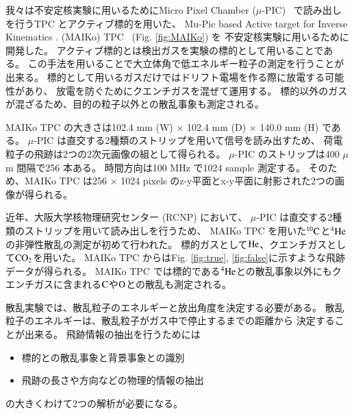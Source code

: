 \documentclass{jps-cp}
\begin{document}
我々は不安定核実験に用いるためにMicro Pixel Chamber ($\mu$-PIC)~\cite{mupic} 
で読み出しを行うTPC とアクティブ標的を用いた、
Mu-Pic based Active target for Inverse Kinematics . (MAIKo) TPC~\cite{MAIKo} (Fig. \ref{fig:MAIKo}) を
不安定核実験に用いるために開発した。
アクティブ標的とは検出ガスを実験の標的として用いることである。
この手法を用いることで大立体角で低エネルギー粒子の測定を行うことが出来る。
標的として用いるガスだけではドリフト電場を作る際に放電する可能性があり、
放電を防ぐためにクエンチガスを混ぜて運用する。
標的以外のガスが混ざるため、目的の粒子以外との散乱事象も測定される。

MAIKo TPC の大きさは102.4 mm (W) $\times$ 102.4 mm (D) $\times$ 140.0 mm (H) である。
$\mu$-PIC は直交する2種類のストリップを用いて信号を読み出すため、
荷電粒子の飛跡は2つの2次元画像の組として得られる。
$\mu$-PIC のストリップは400 $\mu$m 間隔で256 本ある。
時間方向は100 MHz で1024 sample 測定する。
そのため、MAIKo TPC は256 $\times$ 1024 pixels のz-y平面とx-y平面に射影された2つの画像が得られる。

近年、大阪大学核物理研究センター (RCNP) において、
$\mu$-PIC は直交する2種類のストリップを用いて読み出しを行うため、
MAIKo TPC を用いた${}^{10}\rm{C}$と${}^{4}\rm{He}$の非弾性散乱の測定が初めて行われた。
標的ガスとして$\rm{He}$、クエンチガスとして$\rm{CO}_2$を用いた。
MAIKo TPC からはFig. \ref{fig:true}, \ref{fig:false}に示すような飛跡データが得られる。
MAIKo TPC では標的である${}^{4}\rm{He}$との散乱事象以外にもクエンチガスに含まれる$\rm{C}$や$\rm{O}$との散乱も測定される。

散乱実験では、散乱粒子のエネルギーと放出角度を決定する必要がある。
散乱粒子のエネルギーは、散乱粒子がガス中で停止するまでの距離から
決定することが出来る。
飛跡情報の抽出を行うためには
\begin{itemize}
\item 標的との散乱事象と背景事象との識別
\item 飛跡の長さや方向などの物理的情報の抽出
\end{itemize}
の大きくわけて2つの解析が必要になる。
\end{document}
